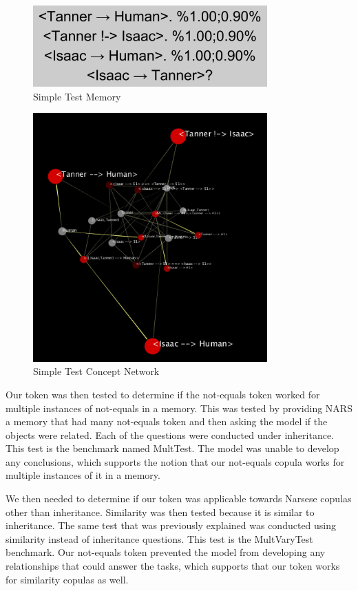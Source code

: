 \documentclass[conference]{IEEEtran}
\begin{document}
\begin{figure}[ht!]
\centering
\includegraphics[width=90mm]{SimpleTest.png}
\caption{Simple Test Memory \label{overflow}}
\end{figure}	

\begin{figure}[ht!]
\centering
\includegraphics[width=90mm]{SmallTest.png}
\caption{Simple Test Concept Network \label{overflow}}
\end{figure}	

	Our token was then tested to determine if the not-equals token worked for multiple instances of not-equals in a memory. This was tested by providing NARS a memory that had many not-equals token and then asking the model if the objects were related. Each of the questions were conducted under inheritance. This test is the benchmark named MultTest. The model was unable to develop any conclusions, which supports the notion that our not-equals copula works for multiple instances of it in a memory.
	
	We then needed to determine if our token was applicable towards Narsese copulas other than inheritance. Similarity was then tested because it is similar to  inheritance. The same test that was previously explained was conducted using similarity instead of inheritance questions. This test is the MultVaryTest benchmark. Our not-equals token prevented the model from developing any relationships that could answer the tasks, which supports that our token works for similarity copulas as well.
\end{document}
